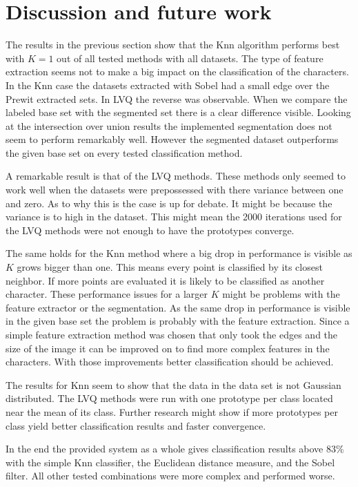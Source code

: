 \newpage
\section{Discussion and future work} %
\label{sec:discussion}

The results in the previous section show that the Knn algorithm performs best with $K=1$ out of all tested methods with all datasets. The type of feature extraction seems not to make a big impact on the classification of the characters. In the Knn case the datasets extracted with Sobel had a small edge over the Prewit extracted sets. In LVQ the reverse was observable.
When we compare the labeled base set with the segmented set there is a clear difference visible. Looking at the intersection over union results the implemented segmentation does not seem to perform remarkably well. However the segmented dataset outperforms the given base set on every tested classification method.

A remarkable result is that of the LVQ methods. These methods only seemed to work well when the datasets were prepossessed with there variance between one and zero. As to why this is the case is up for debate. It might be because the variance is to high in the dataset. This might mean the 2000 iterations used for the LVQ methods were not enough to have the prototypes converge.

The same holds for the Knn method where a big drop in performance is visible as $K$ grows bigger than one. This means every point is classified by its closest neighbor. If more points are evaluated it is likely to be classified as another character. These performance issues for a larger $K$ might be problems with the feature extractor or the segmentation. As the same drop in performance is visible in the given base set the problem is probably with the feature extraction. Since a simple feature extraction method was chosen that only took the edges and the size of the image it can be improved on to find more complex features in the characters. With those improvements better classification should be achieved.

The results for Knn seem to show that the data in the data set is not Gaussian distributed. The LVQ methods were run with one prototype per class located near the mean of its class. Further research might show if more prototypes per class yield better classification results and faster convergence.

In the end the provided system as a whole gives classification results above $83\%$ with the simple Knn classifier, the Euclidean distance measure, and the Sobel filter. All other tested combinations were more complex and performed worse.


